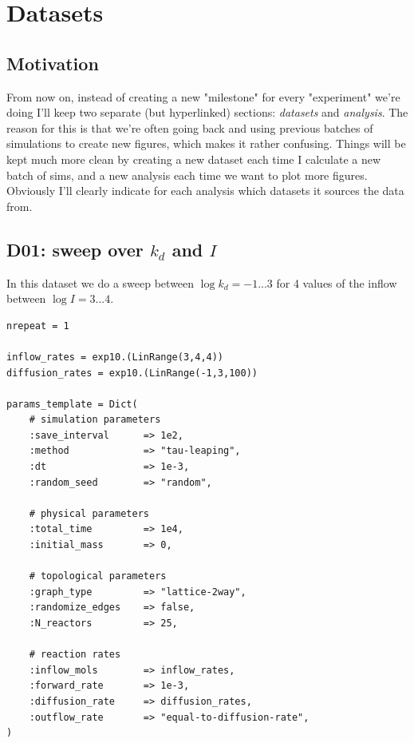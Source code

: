 \documentclass[11pt]{article}
\begin{document}
\clearpage

\section{Datasets}

\subsection{Motivation}

From now on, instead of creating a new "milestone" for every "experiment" we’re doing I’ll keep two separate (but hyperlinked) sections: \textit{datasets} and \textit{analysis}. The reason for this is that we’re often going back and using previous batches of simulations to create new figures, which makes it rather confusing. Things will be kept much more clean by creating a new dataset each time I calculate a new batch of sims, and a new analysis each time we want to plot more figures. Obviously I’ll clearly indicate for each analysis which datasets it sources the data from.

\clearpage

\subsection{D01: sweep over $k_d$ and $I$}
\label{subsec:D01}

In this dataset we do a sweep between $\log k_d = -1...3$ for 4 values of the inflow between $\log I = 3...4$.\\

\begin{lstlisting}[caption={content of \texttt{params.jl}}]
nrepeat = 1

inflow_rates = exp10.(LinRange(3,4,4))
diffusion_rates = exp10.(LinRange(-1,3,100))

params_template = Dict(
    # simulation parameters
    :save_interval    	=> 1e2,
    :method         	=> "tau-leaping",
    :dt             	=> 1e-3,
    :random_seed    	=> "random",

    # physical parameters
    :total_time     	=> 1e4,
    :initial_mass       => 0,

    # topological parameters
    :graph_type         => "lattice-2way",
    :randomize_edges    => false,
    :N_reactors     	=> 25,

    # reaction rates
    :inflow_mols        => inflow_rates,
    :forward_rate   	=> 1e-3,
    :diffusion_rate   	=> diffusion_rates,
    :outflow_rate       => "equal-to-diffusion-rate",
)
\end{lstlisting}
\end{document}
